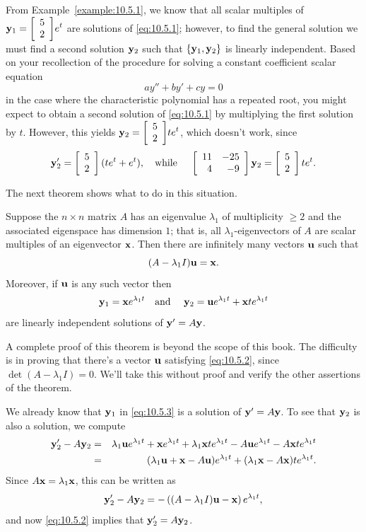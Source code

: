 From Example~\ref{example:10.5.1}, we know that all scalar multiples of
${\bf y}_{1}=\displaystyle{\left[\begin{array}{l}5\\2\end{array}\right]}e^{t}$ are solutions of \eqref{eq:10.5.1}; however, to find the general
solution we must find a second solution ${\bf y}_{2}$ such that $\{{\bf y}_{1},{\bf y}_{2}\}$ is
linearly independent. Based on your recollection of the procedure for solving a constant coefficient
scalar equation
\[
  ay''+by'+cy=0
\]
in the case where the characteristic polynomial has a repeated root, you might expect to obtain a
second solution of \eqref{eq:10.5.1} by multiplying the first solution by $t$. However, this yields
${\bf y}_{2}=\displaystyle{\left[\begin{array}{l}5\\2\end{array}\right]}te^{t}$, which doesn't work, since
\[
  {\bf y}_{2}'=\left[\begin{array}{l}5\\2\end{array}\right](te^{t}+e^{t}),\mbox{\quad while \quad }\left[\begin{array}{rr} 11&-25\\4&-9\end{array}\right]{\bf y}_{2}=\left[\begin{array}{l}5\\2\end{array}\right]te^{t}.
\]

The next theorem shows what to do in this situation.

\begin{theorem}
  \color{blue}
  \label{thmtype:10.5.1} Suppose the $n\times n$ matrix $A$ has an eigenvalue $\lambda_{1}$ of
  multiplicity $\ge2$ and the associated eigenspace has dimension $1$; that is, all
  $\lambda_{1}$-eigenvectors of $A$ are scalar multiples of an eigenvector ${\bf x}$. Then there are
  infinitely many vectors ${\bf u}$ such that
  \begin{equation}
    \label{eq:10.5.2}(A-\lambda_{1}I){\bf u}={\bf x}.
  \end{equation}
  Moreover, if ${\bf u}$ is any such vector then
  \begin{equation}
    \label{eq:10.5.3}{\bf y}_{1}={\bf x}e^{\lambda_{1}t}\quad\mbox{and }\quad{\bf y}_{2}={\bf u}e^{\lambda_{1}t}+{\bf x}te^{\lambda_{1}t}
  \end{equation}
  are linearly independent solutions of ${\bf y}'=A{\bf y}$.
\end{theorem}

A complete proof of this theorem is beyond the scope of this book. The difficulty is in proving that
there's a vector ${\bf u}$ satisfying \eqref{eq:10.5.2}, since $\det(A-\lambda_{1}I)=0$. We'll take
this without proof and verify the other assertions of the theorem.

We already know that ${\bf y}_{1}$ in \eqref{eq:10.5.3} is a solution of ${\bf y}'=A{\bf y}$. To see
that ${\bf y}_{2}$ is also a solution, we compute
\begin{eqnarray*}
  {\bf y}_{2}'-A{\bf y}_{2} & = & \lambda_{1}{\bf u}e^{\lambda_{1}t}+{\bf x}e^{\lambda_{1}t}+\lambda_{1}{\bf x}te^{\lambda_{1}t}-A{\bf u}e^{\lambda_{1}t}-A{\bf x}te^{\lambda_{1}t} \\
                            & = & (\lambda_{1}{\bf u}+{\bf x}-A{\bf u})e^{\lambda_{1}t}+(\lambda_{1}{\bf x}-A{\bf x})te^{\lambda_{1}t}.
\end{eqnarray*}
Since $A{\bf x}=\lambda_{1}{\bf x}$, this can be written as
\[
  {\bf y}_{2}'-A{\bf y}_{2}=- \left((A-\lambda_{1}I){\bf u}-{\bf x}\right)e^{\lambda_{1}t},
\]
and now \eqref{eq:10.5.2} implies that ${\bf y}_{2}'=A{\bf y}_{2}$.

